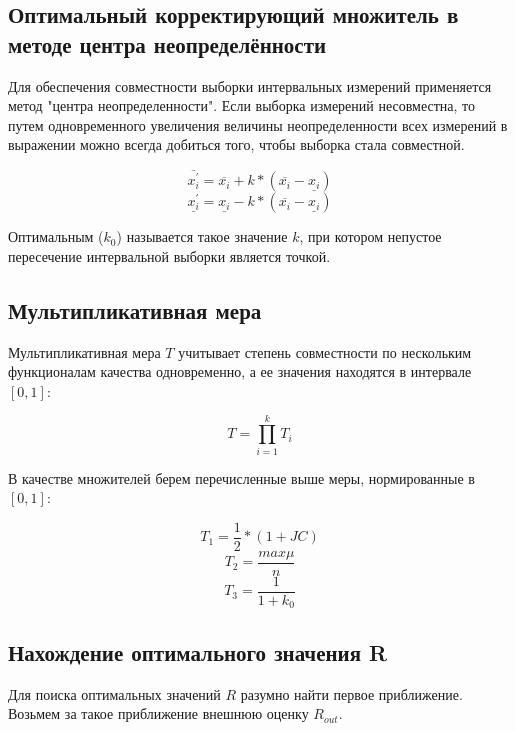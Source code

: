 \documentclass[a4paper,12pt]{article}
\begin{document}
    \subsection{Оптимальный корректирующий множитель в методе центра
    неопределённости}
    \quad Для обеспечения совместности выборки интервальных измерений
    применяется метод "центра неопределенности". Если выборка измерений
    несовместна, то путем одновременного увеличения величины неопределенности
    всех измерений в выражении можно всегда добиться того, чтобы выборка стала
    совместной.

    \begin{equation}
        \overline{x_{i}^{'}} = \overline{x_{i}} + k * (\overline{x_{i}} - \underline{x_{i}})
    \end{equation}
    \begin{equation}
        \underline{x_{i}^{'}} = \underline{x_{i}} - k * (\overline{x_{i}} - \underline{x_{i}})
    \end{equation}

    Оптимальным ($ k_{0} $) называется такое значение $ k $, при котором
    непустое пересечение интервальной выборки является точкой.

    \subsection{Мультипликативная мера}
    \quad Мультипликативная мера $ T $ учитывает степень совместности по
    нескольким функционалам качества одновременно, а ее значения находятся
    в интервале $ [0, 1] $:

    \begin{equation}
        T = \prod_{i=1}^k T_i
        \label{e:Mult}
    \end{equation}

    В качестве множителей берем перечисленные выше меры, нормированные в
    $ [0, 1] $:
    
    \begin{equation}
        T_1 = \frac{1}{2} * (1 + JC)
    \end{equation}
    \begin{equation}
        T_2 = \frac{max \mu}{n}
    \end{equation}
    \begin{equation}
        T_3 = \frac{1}{1 + k_{0}}
    \end{equation}

    \subsection{Нахождение оптимального значения R}
    \quad Для поиска оптимальных значений $ R $ разумно найти первое
    приближение. Возьмем за такое приближение внешнюю оценку $ R_{out} $.
\end{document}

